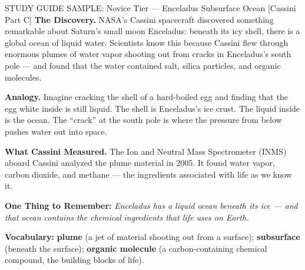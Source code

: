 \documentclass[11pt,letterpaper]{article}
\begin{document}
\begin{samplebox}{STUDY GUIDE SAMPLE: Novice Tier — Enceladus Subsurface Ocean [Cassini Part C]}
\textbf{The Discovery.} NASA's Cassini spacecraft discovered something remarkable about Saturn's small moon Enceladus: beneath its icy shell, there is a global ocean of liquid water. Scientists know this because Cassini flew through enormous plumes of water vapor shooting out from cracks in Enceladus's south pole --- and found that the water contained salt, silica particles, and organic molecules.

\textbf{Analogy.} Imagine cracking the shell of a hard-boiled egg and finding that the egg white inside is still liquid. The shell is Enceladus's ice crust. The liquid inside is the ocean. The ``crack'' at the south pole is where the pressure from below pushes water out into space.

\textbf{What Cassini Measured.} The Ion and Neutral Mass Spectrometer (INMS) aboard Cassini analyzed the plume material in 2005. It found water vapor, carbon dioxide, and methane --- the ingredients associated with life as we know it.

\textbf{One Thing to Remember:} \textit{Enceladus has a liquid ocean beneath its ice --- and that ocean contains the chemical ingredients that life uses on Earth.}

\textbf{Vocabulary:} \textbf{plume} (a jet of material shooting out from a surface); \textbf{subsurface} (beneath the surface); \textbf{organic molecule} (a carbon-containing chemical compound, the building blocks of life).
\end{samplebox}
\end{document}
